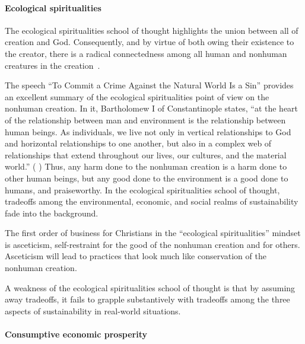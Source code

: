 \documentclass[12pt]{article}
\begin{document}
\paragraph{Ecological spiritualities} 
\label{sec:ecological_spiritualities}

The ecological spiritualities school of thought 
highlights the union between all of creation and God.
Consequently, and by virtue of both owing their existence to the creator,
there is a radical connectedness among all human and nonhuman creatures 
in the creation~\autocite[93]{Jenkins:2008}.

The speech ``To Commit a Crime Against the Natural World Is a Sin'' 
\autocite[133-136]{Bartholomew-I-of-Constantinople:2011aa}
provides an excellent summary of the ecological spiritualities point of view
on the nonhuman creation.
In it, Bartholomew I of Constantinople states,
``at the heart of the relationship between man and environment 
is the relationship between human beings.
As individuals, we live not only in vertical relationships to God 
and horizontal relationships to one another, but 
also in a complex web of relationships that extend throughout
our lives, our cultures, and the material world.''
(\textcite{Bartholomew-I-of-Constantinople:2011aa} 
\textcite[133--134]{Bartholomew-I-of-Constantinople:2011aa})
Thus, any harm done to the nonhuman creation is a harm done to other human beings, but
any good done to the environment is a good done to humans, 
and praiseworthy. 
In the ecological spiritualities school of thought, 
tradeoffs among the environmental, economic, and social realms of sustainability
fade into the background. 

The first order of business for Christians in the ``ecological spiritualities'' mindset 
is asceticism, self-restraint for the good of the nonhuman creation and for others.
Asceticism will lead to practices that look much like conservation of the nonhuman creation.

A weakness of the ecological spiritualities school of thought
is that by assuming away tradeoffs,
it fails to grapple substantively with tradeoffs
among the three aspects of sustainability
in real-world situations.


\paragraph{Consumptive economic prosperity} 
\label{sec:consumptive_economic_prosperity}
\end{document}

